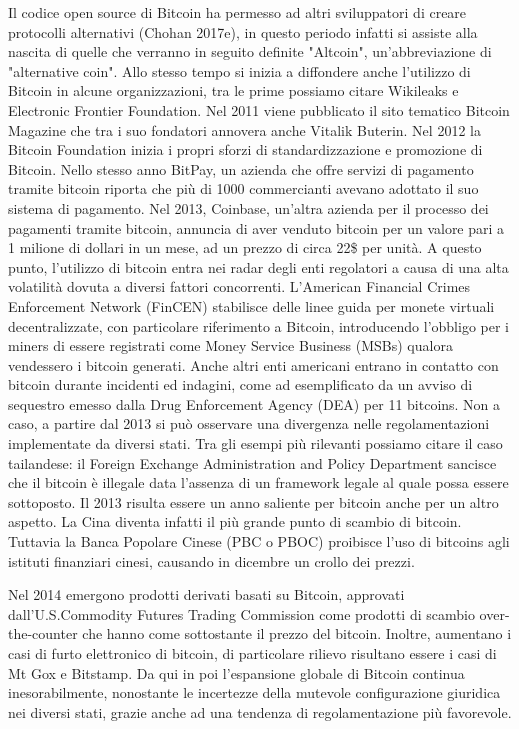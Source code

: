 Il codice open source di Bitcoin ha permesso ad altri sviluppatori di creare protocolli alternativi\cite{K16} (Chohan 2017e), in questo periodo infatti si assiste alla nascita di quelle che verranno in seguito definite "Altcoin", un'abbreviazione di "alternative coin". Allo stesso tempo si inizia a diffondere anche l'utilizzo di Bitcoin in alcune organizzazioni, tra le prime possiamo citare Wikileaks e Electronic Frontier Foundation. Nel 2011 viene pubblicato il sito tematico Bitcoin Magazine che tra i suo fondatori annovera anche Vitalik Buterin. Nel 2012 la Bitcoin Foundation inizia i propri sforzi di standardizzazione e promozione di Bitcoin. Nello stesso anno BitPay, un azienda che offre servizi di pagamento tramite bitcoin riporta che più di 1000 commercianti avevano adottato il suo sistema di pagamento. Nel 2013, Coinbase, un'altra azienda per il processo dei pagamenti tramite bitcoin, annuncia di aver venduto bitcoin per un valore pari a 1 milione di dollari in un mese, ad un prezzo di circa 22\$ per unità. 
A questo punto, l'utilizzo di bitcoin entra nei radar degli enti regolatori a causa di una alta volatilità dovuta a diversi fattori concorrenti. L'American Financial Crimes Enforcement Network (FinCEN) stabilisce delle linee guida per monete virtuali decentralizzate, con particolare riferimento a Bitcoin, introducendo l'obbligo per i miners di essere registrati come Money Service Business (MSBs) qualora vendessero i bitcoin generati\cite{K17}. Anche altri enti americani entrano in contatto con bitcoin durante incidenti ed indagini, come ad esemplificato da un avviso di sequestro emesso dalla Drug Enforcement Agency (DEA) per 11 bitcoins. Non a caso, a partire dal 2013 si può osservare una divergenza nelle regolamentazioni implementate da diversi stati. 
Tra gli esempi più rilevanti possiamo citare il caso tailandese: il Foreign Exchange Administration and Policy Department sancisce che il bitcoin è illegale data l'assenza di un framework legale al quale possa essere sottoposto\cite{K18}. Il 2013 risulta essere un anno saliente per bitcoin anche per un altro aspetto. La Cina diventa infatti il più grande punto di scambio di bitcoin. Tuttavia la Banca Popolare Cinese (PBC o PBOC) proibisce l'uso di bitcoins agli istituti finanziari cinesi, causando in dicembre un crollo dei prezzi\cite{K19}. 

Nel 2014 emergono prodotti derivati basati su Bitcoin, approvati dall'U.S.Commodity Futures Trading Commission come prodotti di scambio over-the-counter che hanno come sottostante il prezzo del bitcoin. Inoltre, aumentano i casi di furto elettronico di bitcoin, di particolare rilievo risultano essere i casi di Mt Gox e Bitstamp. 
Da qui in poi l'espansione globale di Bitcoin continua inesorabilmente, nonostante le incertezze della mutevole configurazione giuridica nei diversi stati, grazie anche ad una tendenza di regolamentazione più favorevole.  

